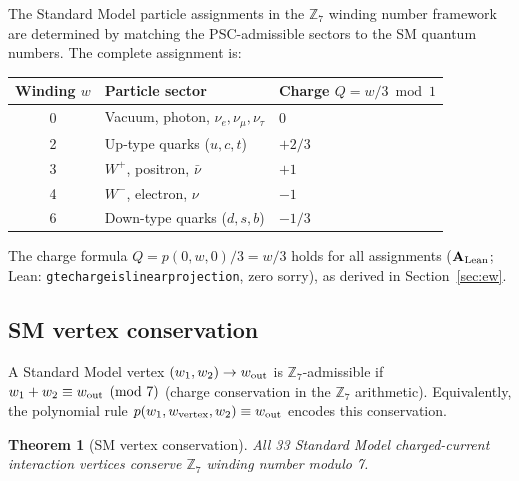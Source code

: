 \documentclass[11pt]{article}
\newtheorem{theorem}{Theorem}[section]
\theoremstyle{remark}
\newcommand{\ZS}{\mathbb{Z}_7}
\newcommand{\lean}[1]{%
  \penalty-100
  \begingroup\def\_{\textunderscore\allowbreak}\texttt{#1}\endgroup}
\newcommand{\CatAL}{\ensuremath{\textbf{A}_{\rm Lean}}}
\begin{document}
The Standard Model particle assignments in the $\ZS$ winding number framework
are determined by matching the PSC-admissible sectors to the SM quantum numbers.
The complete assignment is:
\begin{center}
\begin{tabular}{cll}
\toprule
Winding $w$ & Particle sector & Charge $Q = w/3 \bmod 1$\\
\midrule
0 & Vacuum, photon, $\nu_e,\nu_\mu,\nu_\tau$ & 0\\
2 & Up-type quarks ($u,c,t$) & $+2/3$\\
3 & $W^+$, positron, $\bar\nu$ & $+1$\\
4 & $W^-$, electron, $\nu$ & $-1$\\
6 & Down-type quarks ($d,s,b$) & $-1/3$\\
\bottomrule
\end{tabular}
\end{center}
The charge formula $Q = p(0,w,0)/3 = w/3$ holds for all assignments
($\CatAL$; Lean: \lean{gte\_charge\_is\_linear\_projection}, zero sorry), as derived in
Section~\ref{sec:ew}.

\subsection{SM vertex conservation}
\label{ssec:vertices}

A Standard Model vertex $(w_1, w_2) \to w_{\rm out}$ is $\ZS$-admissible if
$w_1 + w_2 \equiv w_{\rm out} \pmod 7$ (charge conservation in the $\ZS$ arithmetic).
Equivalently, the polynomial rule $p(w_1, w_{\rm vertex}, w_2) \equiv w_{\rm out}$
encodes this conservation.

\begin{theorem}[SM vertex conservation]
All 33 Standard Model charged-current interaction vertices conserve $\ZS$ winding
number modulo 7.
\end{theorem}
\end{document}
